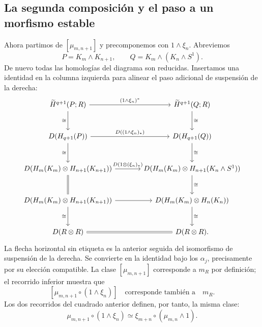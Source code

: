 \subsection{La segunda composición y el paso a un morfismo estable}
Ahora partimos de $[\mu_{m,n+1}]$ y precomponemos con $1\wedge\xi_n$. Abreviemos
\[
P=K_m\wedge K_{n+1},\qquad
Q=K_m\wedge(K_n\wedge S^1).
\]
De nuevo todas las homologías del diagrama son reducidas. Insertamos una identidad en la columna izquierda para alinear el paso adicional de suspensión de la derecha:
\[
\begin{tikzcd}[column sep=large,row sep=large]
\widetilde H^{q+1}(P;R)\arrow[r,"(1\wedge\xi_n)^*"]\arrow[d,"\cong"']&
\widetilde H^{q+1}(Q;R)\arrow[d,"\cong"]\\
D(H_{q+1}(P))\arrow[r,"D((1\wedge\xi_n)_*)"]\arrow[d,"\cong"']&
D(H_{q+1}(Q))\arrow[d,"\cong"]\\
D(H_m(K_m)\otimes H_{n+1}(K_{n+1}))
 \arrow[r,"D(1\otimes(\xi_n)_*)"]\arrow[d,equal]&
D(H_m(K_m)\otimes H_{n+1}(K_n\wedge S^1))\arrow[d,"\cong"]\\
D(H_m(K_m)\otimes H_{n+1}(K_{n+1}))
 \arrow[r]\arrow[d,"\cong"']&
D(H_m(K_m)\otimes H_n(K_n))\arrow[d,"\cong"]\\
D(R\otimes R)\arrow[r,equal]&D(R\otimes R).
\end{tikzcd}
\]
La flecha horizontal sin etiqueta es la anterior seguida del isomorfismo de suspensión de la derecha. Se convierte en la identidad bajo los $\alpha_j$, precisamente por su elección compatible. La clase $[\mu_{m,n+1}]$ corresponde a $m_R$ por definición; el recorrido inferior muestra que
\[
[\mu_{m,n+1}\circ(1\wedge\xi_n)]
\quad\text{corresponde también a}\quad m_R.
\]
Los dos recorridos del cuadrado anterior definen, por tanto, la misma clase:
\[
\mu_{m,n+1}\circ(1\wedge\xi_n)
\simeq\xi_{m+n}\circ(\mu_{m,n}\wedge1).
\]

